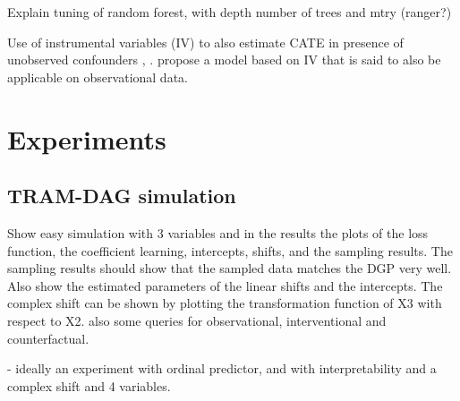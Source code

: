 Explain tuning of random forest, with depth number of trees and mtry (ranger?)



Use of instrumental variables (IV) to also estimate CATE in presence of unobserved confounders \citep{nichols2007}, \citep{hartford2017}. \citet{frauen2023} propose a model based on IV that is said to also be applicable on observational data. %








\section{Experiments}

\subsection{TRAM-DAG simulation}

Show easy simulation with 3 variables and in the results the plots of the loss function, the coefficient learning, intercepts, shifts, and the sampling results. The sampling results should show that the sampled data matches the DGP very well. Also show the estimated parameters of the linear shifts and the intercepts. The complex shift can be shown by plotting the transformation function of X3 with respect to X2. also some queries for observational, interventional and counterfactual.

- ideally an experiment with ordinal predictor, and with interpretability and a complex shift and 4 variables.



